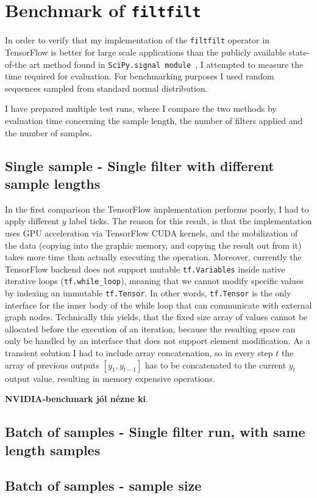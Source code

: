 \chapter{Benchmark of \texttt{filtfilt}}

In order to verify that my implementation of the \texttt{filtfilt} operator in TensorFlow is better for large scale applications than the publicly available state-of-the art method found in \texttt{SciPy.signal module}~\cite{scipy}, I attempted to measure the time required for evaluation.
For benchmarking purposes I used random sequences sampled from standard normal distribution.

I have prepared multiple test runs, where I compare the two methods by evaluation time concerning the sample length, the number of filters applied and the number of samples.

\section{Single sample - Single filter with different sample lengths}
In the first comparison the TensorFlow implementation performs poorly, I had to apply different $y$ label ticks.
The reason for this result, is that the implementation uses GPU acceleration via TensorFlow CUDA kernels, and the mobilization of the data (copying into the graphic memory, and copying the result out from it) takes more time than actually executing the operation.
Moreover, currently the TensorFlow backend does not support mutable \texttt{tf.Variables} inside native iterative loops (\texttt{tf.while_loop}), meaning that we cannot modify specific values by indexing an immutable \texttt{tf.Tensor}.
In other words, \texttt{tf.Tensor} is the only interface for the inner body of the while loop that can communicate with external graph nodes.
Technically this yields, that the fixed size array of values cannot be allocated before the execution of an iteration, because the resulting space can only be handled by an interface that does not support element modification.
As a transient solution I had to include array concatenation, so in every step $t$ the array of previous outputs $[y_{1}, y_{t-1}]$ has to be concatenated to the current $y_t$ output value, resulting in memory expensive operations.

\textbf{NVIDIA-benchmark jól nézne ki}.

\section{Batch of samples - Single filter run, with same length samples}

\section{Batch of samples - sample size}
